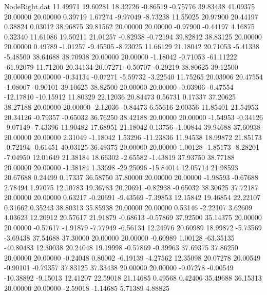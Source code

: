 \begin{filecontents}{NodeRight.dat}
  11.49971   19.60281   18.32726    -0.86519   -0.75776   39.83438   41.09375   20.00000   20.00000    0.39719    1.67274   -9.97049   -8.73238
  11.55025   20.97900   20.44197     0.38824    0.03012   38.96875   39.81562   20.00000   20.00000   -0.97900   -0.44197    4.16875    0.32340
  11.61086   19.50211   21.01257    -0.82938   -0.72194   39.82812   38.83125   20.00000   20.00000    0.49789   -1.01257   -9.45505   -8.23025
  11.66129   21.18042   20.71053    -5.41338   -5.48500   38.64688   38.70938   20.00000   20.00000   -1.18042   -0.71053  -61.11222  -61.92079
  11.71200   20.34134   20.07271    -0.50707   -0.29219   38.80625   39.12500   20.00000   20.00000   -0.34134   -0.07271   -5.59732   -3.22540
  11.75265   20.03906   20.47554    -1.08007   -0.90101   39.10625   38.82500   20.00000   20.00000   -0.03906   -0.47554  -12.17810  -10.15912
  11.80329   22.12036   20.84473     0.56731    0.17337   37.20625   38.27188   20.00000   20.00000   -2.12036   -0.84473    6.55616    2.00356
  11.85401   21.54953   20.34126    -0.79357   -0.65032   36.76250   38.42188   20.00000   20.00000   -1.54953   -0.34126   -9.07149   -7.43396
  11.90482   17.68951   21.18042     0.13756   -1.00844   39.94688   37.60938   20.00000   20.00000    2.31049   -1.18042    1.53296  -11.23836
  11.94538   18.99872   21.85173    -0.72194   -0.61451   40.03125   36.49375   20.00000   20.00000    1.00128   -1.85173   -8.28201   -7.04950
  12.01649   21.38184   18.66302    -2.65582   -1.43819   37.93750   38.77188   20.00000   20.00000   -1.38184    1.33698  -29.25096  -15.84014
  12.05714   21.98593   20.67688     0.24499    0.17337   36.58750   37.80000   20.00000   20.00000   -1.98593   -0.67688    2.78494    1.97075
  12.10783   19.36783   20.20691    -0.82938   -0.65032   38.30625   37.72187   20.00000   20.00000    0.63217   -0.20691   -9.43569   -7.39853
  12.15842   19.46854   22.22107     0.31662    0.35243   38.80313   35.85938   20.00000   20.00000    0.53146   -2.22107    3.62609    4.03623
  12.20912   20.57617   21.91879    -0.68613   -0.57869   37.92500   35.14375   20.00000   20.00000   -0.57617   -1.91879   -7.77949   -6.56134
  12.24976   20.60989   18.99872    -5.73569   -3.69438   37.54688   37.30000   20.00000   20.00000   -0.60989    1.00128  -63.35135  -40.80483
  12.30038   20.24048   19.19998    -0.57869   -0.39963   37.69375   37.86250   20.00000   20.00000   -0.24048    0.80002   -6.19139   -4.27562
  12.35098   20.07278   20.00549    -0.90101   -0.79357   37.83125   37.33438   20.00000   20.00000   -0.07278   -0.00549  -10.38892   -9.15013
  12.41207   22.59018   21.14685     0.49568    0.42406   35.49688   36.15313   20.00000   20.00000   -2.59018   -1.14685    5.71389    4.88825

\end{filecontents}
